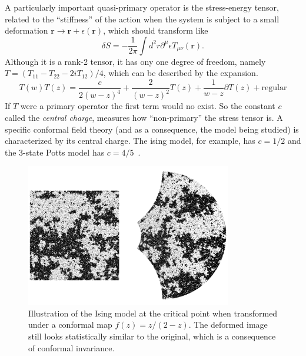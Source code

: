 A particularly important quasi-primary operator is the stress-energy tensor,
related to the ``stiffness'' of the action when the system is subject to a small
deformation $\mathbf{r}\rightarrow \mathbf{r} + \epsilon(\mathbf{r})$, which
should transform like
\begin{equation}
    \delta S=
    -\frac{1}{2\pi}
    \int d^{2}r\partial^{\mu}\epsilon T_{\mu\nu}\left(\mathbf{r}\right).
\end{equation}
Although it is a rank-2 tensor, it has ony one degree of freedom, namely
$T=(T_{11}-T_{22}-2iT_{12})/4$, which can be described by the expansion.
\begin{equation}
    T\left(w\right)T\left(z\right)=
    \frac{c}{2{\left(w-z\right)}^{4}}+
    \frac{2}{{\left(w-z\right)}^{2}}T\left(z\right)+
    \frac{1}{w-z}\partial T\left(z\right)+\mbox{regular}
\end{equation}
If $T$ were a primary operator the first term would no exist. So the constant
$c$ called the \textit{central charge}, measures how ``non-primary'' the stress
tensor is. A specific conformal field theory (and as a consequence, the model
being studied) is characterized by its central charge. The ising model, for
example, has $c=1/2$ and the 3-state Potts model has
$c=4/5$~\cite{Francesco1997}.

\begin{figure}
\begin{center}
    \includegraphics[width=0.8\textwidth]{chapters/ch3-conf/figs/isingcm}
\end{center}
\caption{Illustration of the Ising model at the critical point when transformed
    under a conformal map $f(z)=z/(2-z)$. The deformed image still looks
    statistically similar to the original, which is a consequence of conformal
    invariance.}
\label{fig:isingcm}
\end{figure}

